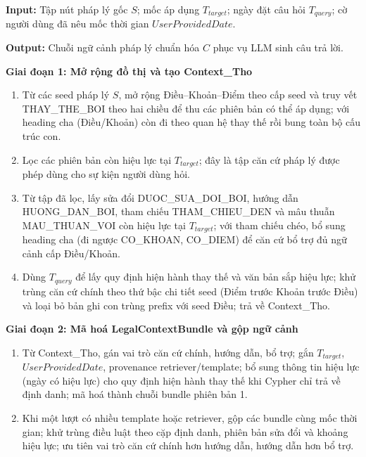 \documentclass[../DoAn.tex]{subfiles}
\begin{document}
\begin{algorithm}[H]
\footnotesize
\textbf{Input:} Tập nút pháp lý gốc $S$; mốc áp dụng $T_{target}$; ngày đặt câu hỏi $T_{query}$; cờ người dùng đã nêu mốc thời gian $UserProvidedDate$.

\textbf{Output:} Chuỗi ngữ cảnh pháp lý chuẩn hóa $C$ phục vụ LLM sinh câu trả lời.

\textbf{Giai đoạn 1: Mở rộng đồ thị và tạo Context\_Tho}

\begin{enumerate}[label=\textbf{Bước \arabic*.}, leftmargin=1.6cm]
    \item Từ các seed pháp lý $S$, mở rộng Điều--Khoản--Điểm theo cấp seed và truy vết THAY\_THE\_BOI theo hai chiều để thu các phiên bản có thể áp dụng; với heading cha (Điều/Khoản) còn đi theo quan hệ thay thế rồi bung toàn bộ cấu trúc con.
    \item Lọc các phiên bản còn hiệu lực tại $T_{target}$; đây là tập căn cứ pháp lý được phép dùng cho sự kiện người dùng hỏi.
    \item Từ tập đã lọc, lấy sửa đổi DUOC\_SUA\_DOI\_BOI, hướng dẫn HUONG\_DAN\_BOI, tham chiếu THAM\_CHIEU\_DEN và mâu thuẫn MAU\_THUAN\_VOI còn hiệu lực tại $T_{target}$; với tham chiếu chéo, bổ sung heading cha (đi ngược CO\_KHOAN, CO\_DIEM) để căn cứ bổ trợ đủ ngữ cảnh cấp Điều/Khoản.
    \item Dùng $T_{query}$ để lấy quy định hiện hành thay thế và văn bản sắp hiệu lực; khử trùng căn cứ chính theo thứ bậc chi tiết seed (Điểm trước Khoản trước Điều) và loại bỏ bản ghi con trùng prefix với seed Điều; trả về Context\_Tho.
\end{enumerate}

\textbf{Giai đoạn 2: Mã hoá LegalContextBundle và gộp ngữ cảnh}

\begin{enumerate}[label=\textbf{Bước \arabic*.}, leftmargin=1.6cm, resume]
    \item Từ Context\_Tho, gán vai trò căn cứ chính, hướng dẫn, bổ trợ; gắn $T_{target}$, $UserProvidedDate$, provenance retriever/template; bổ sung thông tin hiệu lực (ngày có hiệu lực) cho quy định hiện hành thay thế khi Cypher chỉ trả về định danh; mã hoá thành chuỗi bundle phiên bản 1.
    \item Khi một lượt có nhiều template hoặc retriever, gộp các bundle cùng mốc thời gian; khử trùng điều luật theo cặp định danh, phiên bản sửa đổi và khoảng hiệu lực; ưu tiên vai trò căn cứ chính hơn hướng dẫn, hướng dẫn hơn bổ trợ.
\end{enumerate}


\end{algorithm}
\end{document}
